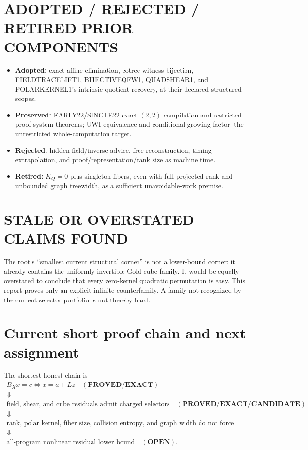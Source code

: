 \documentclass[11pt]{article}
\newcommand{\EXACT}{\textbf{PROVED/EXACT}}
\newcommand{\CAND}{\textbf{CANDIDATE}}
\newcommand{\OPEN}{\textbf{OPEN}}
\begin{document}
\section{ADOPTED / REJECTED / RETIRED PRIOR COMPONENTS}
\begin{itemize}
\item \textbf{Adopted:} exact affine elimination, cotree witness bijection,
FIELDTRACELIFT1, BIJECTIVEQFW1, QUADSHEAR1, and POLARKERNEL1's intrinsic
quotient recovery, at their declared structured scopes.
\item \textbf{Preserved:} EARLY22/SINGLE22 exact-$(2,2)$ compilation and
restricted proof-system theorems; UWI equivalence and conditional growing
factor; the unrestricted whole-computation target.
\item \textbf{Rejected:} hidden field/inverse advice, free reconstruction,
timing extrapolation, and proof/representation/rank size as machine time.
\item \textbf{Retired:} $K_Q=0$ plus singleton fibers, even with full
projected rank and unbounded graph treewidth, as a sufficient unavoidable-work
premise.
\end{itemize}

\section{STALE OR OVERSTATED CLAIMS FOUND}
The root's ``smallest current structural corner'' is not a lower-bound corner:
it already contains the uniformly invertible Gold cube family.  It would be
equally overstated to conclude that every zero-kernel quadratic permutation
is easy.  This report proves only an explicit infinite counterfamily.  A
family not recognized by the current selector portfolio is not thereby hard.

\section{Current short proof chain and next assignment}
The shortest honest chain is
\[
\begin{array}{c}
B_Xx=c\Longleftrightarrow x=a+Lz\quad(\EXACT)\\
\Downarrow\\
\text{field, shear, and cube residuals admit charged selectors}
\quad(\EXACT/\CAND)\\
\Downarrow\\
\text{rank, polar kernel, fiber size, collision entropy, and graph width
do not force work}\\
\Downarrow\\
\text{all-program nonlinear residual lower bound}\quad(\OPEN).
\end{array}
\]
\end{document}
